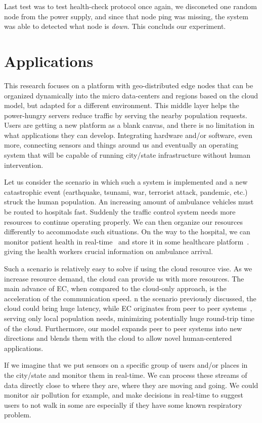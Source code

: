 Last test was to test health-check protocol once again, we disconeted one random node from the power supply, and since that node ping was missing, the system was able to detected what node is \emph{down}. This concluds our experiment.
%
%
\section{Applications}\label{sec:app}
%
This research focuses on a platform with geo-distributed edge nodes that can be organized dynamically into the micro data-centers and regions based on the cloud model, but adapted for a different environment. This middle layer helps the power-hungry servers reduce traffic by serving the nearby population requests. Users are getting a new platform as a blank canvas, and there is no limitation in what applications they can develop. Integrating hardware and/or software, even more, connecting sensors and things around us and eventually an operating system that will be capable of running city/state infrastructure without human intervention.

Let us consider the scenario in which such a system is implemented and a new catastrophic event (earthquake, tsunami, war, terrorist attack, pandemic, etc.) struck the human population. An increasing amount of ambulance vehicles must be routed to hospitals fast. Suddenly the traffic control system needs more resources to continue operating properly. We can then organize our resources differently to accommodate such situations. On the way to the hospital, we can monitor patient health in real-time~\cite{Al-KhafajiyBCAK19} and store it in some healthcare platform~\cite{OmarBBKR19, inproceedingsSimic5}. giving the health workers crucial information on ambulance arrival. 

Such a scenario is relatively easy to solve if using the cloud resource vise. As we increase resource demand, the cloud can provide us with more resources. The main advance of EC, when compared to the cloud-only approach, is the acceleration of the communication speed. n the scenario previously discussed, the cloud could bring huge latency, while EC originates from peer to peer systems~\cite{LopezMEDHIBFR15}, serving only local population needs, minimizing potentially huge round-trip time of the cloud. Furthermore, our model expands peer to peer systems into new directions and blends them with the cloud to allow novel human-centered applications. 

If we imagine that we put sensors on a specific group of users and/or places in the city/state and monitor them in real-time. We can process these streams of data directly close to where they are, where they are moving and going. We could monitor air pollution for example, and make decisions in real-time to suggest users to not walk in some are especially if they have some known respiratory problem.

